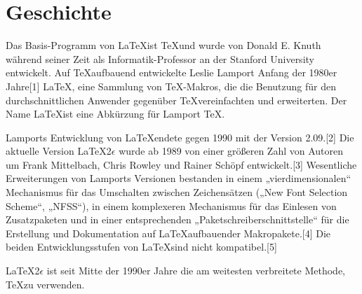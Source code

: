 
\chapter{Geschichte}

Das Basis-Programm von \LaTeX ist \TeX und wurde von Donald E. Knuth während seiner Zeit als Informatik-Professor an der Stanford University entwickelt. Auf \TeX aufbauend entwickelte Leslie Lamport Anfang der 1980er Jahre[1] \LaTeX, eine Sammlung von TeX-Makros, die die Benutzung für den durchschnittlichen Anwender gegenüber \TeX vereinfachten und erweiterten. Der Name \LaTeX ist eine Abkürzung für Lamport \TeX.

Lamports Entwicklung von \LaTeX endete gegen 1990 mit der Version 2.09.[2] Die aktuelle Version \LaTeX 2$\epsilon$ wurde ab 1989 von einer größeren Zahl von Autoren um Frank Mittelbach, Chris Rowley und Rainer Schöpf entwickelt.[3] Wesentliche Erweiterungen von Lamports Versionen bestanden in einem „vierdimensionalen“ Mechanismus für das Umschalten zwischen Zeichensätzen („New Font Selection Scheme“, „NFSS“), in einem komplexeren Mechanismus für das Einlesen von Zusatzpaketen und in einer entsprechenden „Paketschreiberschnittstelle“ für die Erstellung und Dokumentation auf \LaTeX aufbauender Makropakete.[4] Die beiden Entwicklungsstufen von \LaTeX sind nicht kompatibel.[5]

\LaTeX 2$\epsilon$ ist seit Mitte der 1990er Jahre die am weitesten verbreitete Methode, \TeX zu verwenden.